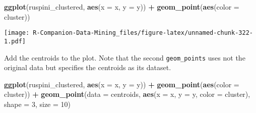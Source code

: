 \documentclass[
  notitlepage]{book}
\newenvironment{Shaded}{\begin{snugshade}}{\end{snugshade}}
\newcommand{\CommentTok}[1]{\textcolor[rgb]{0.56,0.35,0.01}{\textit{#1}}}
\newcommand{\DataTypeTok}[1]{\textcolor[rgb]{0.13,0.29,0.53}{#1}}
\newcommand{\DecValTok}[1]{\textcolor[rgb]{0.00,0.00,0.81}{#1}}
\newcommand{\KeywordTok}[1]{\textcolor[rgb]{0.13,0.29,0.53}{\textbf{#1}}}
\newcommand{\NormalTok}[1]{#1}
\newcommand{\OperatorTok}[1]{\textcolor[rgb]{0.81,0.36,0.00}{\textbf{#1}}}
\newcommand{\StringTok}[1]{\textcolor[rgb]{0.31,0.60,0.02}{#1}}
\begin{document}
\begin{Shaded}
\begin{Highlighting}[]
\KeywordTok{ggplot}\NormalTok{(ruspini\_clustered, }\KeywordTok{aes}\NormalTok{(}\DataTypeTok{x =}\NormalTok{ x, }\DataTypeTok{y =}\NormalTok{ y)) }\OperatorTok{+}\StringTok{ }
\StringTok{  }\KeywordTok{geom\_point}\NormalTok{(}\KeywordTok{aes}\NormalTok{(}\DataTypeTok{color =}\NormalTok{ cluster))}
\end{Highlighting}
\end{Shaded}

\texttt{[image: R-Companion-Data-Mining\_files/figure-latex/unnamed-chunk-322-1.pdf]}

Add the centroids to the plot. Note that the second \texttt{geom\_points} uses
not the original data but specifies the centroids as its dataset.

\begin{Shaded}
\end{Shaded}

\begin{Shaded}
\begin{Highlighting}[]
\KeywordTok{ggplot}\NormalTok{(ruspini\_clustered, }\KeywordTok{aes}\NormalTok{(}\DataTypeTok{x =}\NormalTok{ x, }\DataTypeTok{y =}\NormalTok{ y)) }\OperatorTok{+}\StringTok{ }
\StringTok{  }\KeywordTok{geom\_point}\NormalTok{(}\KeywordTok{aes}\NormalTok{(}\DataTypeTok{color =}\NormalTok{ cluster)) }\OperatorTok{+}
\StringTok{  }\KeywordTok{geom\_point}\NormalTok{(}\DataTypeTok{data =}\NormalTok{ centroids, }\KeywordTok{aes}\NormalTok{(}\DataTypeTok{x =}\NormalTok{ x, }\DataTypeTok{y =}\NormalTok{ y, }\DataTypeTok{color =}\NormalTok{ cluster), }
             \DataTypeTok{shape =} \DecValTok{3}\NormalTok{, }\DataTypeTok{size =} \DecValTok{10}\NormalTok{)}
\end{Highlighting}
\end{Shaded}
\end{document}
